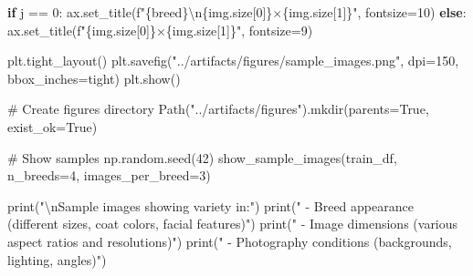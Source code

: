\documentclass[
  letterpaper,
  DIV=11,
  numbers=noendperiod]{scrartcl}
\newenvironment{Shaded}{\begin{snugshade}}{\end{snugshade}}
\newcommand{\BuiltInTok}[1]{\textcolor[rgb]{0.00,0.23,0.31}{#1}}
\newcommand{\CharTok}[1]{\textcolor[rgb]{0.13,0.47,0.30}{#1}}
\newcommand{\CommentTok}[1]{\textcolor[rgb]{0.37,0.37,0.37}{#1}}
\newcommand{\ControlFlowTok}[1]{\textcolor[rgb]{0.00,0.23,0.31}{\textbf{#1}}}
\newcommand{\DecValTok}[1]{\textcolor[rgb]{0.68,0.00,0.00}{#1}}
\newcommand{\NormalTok}[1]{\textcolor[rgb]{0.00,0.23,0.31}{#1}}
\newcommand{\OperatorTok}[1]{\textcolor[rgb]{0.37,0.37,0.37}{#1}}
\newcommand{\SpecialCharTok}[1]{\textcolor[rgb]{0.37,0.37,0.37}{#1}}
\newcommand{\SpecialStringTok}[1]{\textcolor[rgb]{0.13,0.47,0.30}{#1}}
\newcommand{\StringTok}[1]{\textcolor[rgb]{0.13,0.47,0.30}{#1}}
\newcommand{\VariableTok}[1]{\textcolor[rgb]{0.07,0.07,0.07}{#1}}
\renewenvironment{Shaded}{%
  \begin{tcolorbox}[%
    enhanced,%
    colback=codebg,%
    colframe=codebg,%
    borderline west={3pt}{0pt}{sectionblue},%
    boxrule=0pt,%
    arc=0pt,%
    boxsep=5pt,%
    left=2mm,%
    right=2mm,%
    top=2mm,%
    bottom=2mm%
  ]%
}{%
  \end{tcolorbox}%
}
\begin{document}
\begin{Shaded}
\begin{Highlighting}[]
            \ControlFlowTok{if}\NormalTok{ j }\OperatorTok{==} \DecValTok{0}\NormalTok{:}
\NormalTok{                ax.set\_title(}\SpecialStringTok{f"}\SpecialCharTok{\{}\NormalTok{breed}\SpecialCharTok{\}}\CharTok{\textbackslash{}n}\SpecialCharTok{\{}\NormalTok{img}\SpecialCharTok{.}\NormalTok{size[}\DecValTok{0}\NormalTok{]}\SpecialCharTok{\}}\SpecialStringTok{×}\SpecialCharTok{\{}\NormalTok{img}\SpecialCharTok{.}\NormalTok{size[}\DecValTok{1}\NormalTok{]}\SpecialCharTok{\}}\SpecialStringTok{"}\NormalTok{, fontsize}\OperatorTok{=}\DecValTok{10}\NormalTok{)}
            \ControlFlowTok{else}\NormalTok{:}
\NormalTok{                ax.set\_title(}\SpecialStringTok{f"}\SpecialCharTok{\{}\NormalTok{img}\SpecialCharTok{.}\NormalTok{size[}\DecValTok{0}\NormalTok{]}\SpecialCharTok{\}}\SpecialStringTok{×}\SpecialCharTok{\{}\NormalTok{img}\SpecialCharTok{.}\NormalTok{size[}\DecValTok{1}\NormalTok{]}\SpecialCharTok{\}}\SpecialStringTok{"}\NormalTok{, fontsize}\OperatorTok{=}\DecValTok{9}\NormalTok{)}
    
\NormalTok{    plt.tight\_layout()}
\NormalTok{    plt.savefig(}\StringTok{"../artifacts/figures/sample\_images.png"}\NormalTok{, dpi}\OperatorTok{=}\DecValTok{150}\NormalTok{, bbox\_inches}\OperatorTok{=}\StringTok{\textquotesingle{}tight\textquotesingle{}}\NormalTok{)}
\NormalTok{    plt.show()}

\CommentTok{\# Create figures directory}
\NormalTok{Path(}\StringTok{"../artifacts/figures"}\NormalTok{).mkdir(parents}\OperatorTok{=}\VariableTok{True}\NormalTok{, exist\_ok}\OperatorTok{=}\VariableTok{True}\NormalTok{)}

\CommentTok{\# Show samples}
\NormalTok{np.random.seed(}\DecValTok{42}\NormalTok{)}
\NormalTok{show\_sample\_images(train\_df, n\_breeds}\OperatorTok{=}\DecValTok{4}\NormalTok{, images\_per\_breed}\OperatorTok{=}\DecValTok{3}\NormalTok{)}

\BuiltInTok{print}\NormalTok{(}\StringTok{"}\CharTok{\textbackslash{}n}\StringTok{Sample images showing variety in:"}\NormalTok{)}
\BuiltInTok{print}\NormalTok{(}\StringTok{"  {-} Breed appearance (different sizes, coat colors, facial features)"}\NormalTok{)}
\BuiltInTok{print}\NormalTok{(}\StringTok{"  {-} Image dimensions (various aspect ratios and resolutions)"}\NormalTok{)}
\BuiltInTok{print}\NormalTok{(}\StringTok{"  {-} Photography conditions (backgrounds, lighting, angles)"}\NormalTok{)}
\end{Highlighting}
\end{Shaded}
\end{document}
